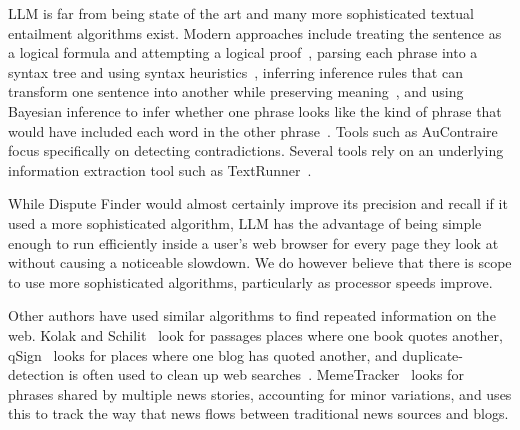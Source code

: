 \documentclass{www2010-submission}
\newcommand{\todo}[1]{}
\begin{document}
LLM is far from being state of the art and many more sophisticated textual entailment algorithms exist. Modern approaches include treating the sentence as a logical formula and attempting a logical proof~\cite{Bayer2001,Bos2005}, parsing each phrase into a syntax tree and using syntax heuristics~\cite{Snow2006}, inferring inference rules that can transform one sentence into another while preserving meaning~\cite{Lin2001,Dinu2009,Bhagat2009}, and using Bayesian inference to infer whether one phrase looks like the kind of phrase that would have included each word in the other phrase~\cite{Glickman2005}. Tools such as AuContraire~\cite{Ritter} focus specifically on detecting contradictions. Several tools rely on an underlying information extraction tool such as TextRunner~\cite{Etzioni2008}.

While Dispute Finder would almost certainly improve its precision and recall if it used a more sophisticated algorithm, LLM has the advantage of being simple enough to run efficiently inside a user's web browser for every page they look at without causing a noticeable slowdown. We do however believe that there is scope to use more sophisticated algorithms, particularly as processor speeds improve.


\todo{Mention that we could add the +ve and -ve n-grams to the client code? Actually do this?}

\todo{Discuss how and why this is simpler than the server-side classification method}
\todo{Explain how we avoid downloading the entire database}

\todo{Should we have a version where the interface merely suggests n-grams that should be used by the classifier}
\todo{Can we present all these systems without giving detailed stats about how they compare?}
\todo{Add support for a user to enter 'anti-phrases' when a snippet is wrongly highlighted}
\todo{Add support for a user to enter a paraphrase that will match the snippet they are looking at}
\todo{Do a load more people in a final user-study round. Try to get it up to 8.}
\todo{Explain how our algorithm relates to existing NLP work - due to unusual domain}


Other authors have used similar algorithms to find repeated information on the web. Kolak and Schilit~\cite{Kolak2008} look for passages places where one book quotes another, qSign~\cite{Kim2009} looks for places where one blog has quoted another, and duplicate-detection is often used to clean up web searches~\cite{Theobald2008}. MemeTracker~\cite{Backstrom2009} looks for phrases shared by multiple news stories, accounting for minor variations, and uses this to track the way that news flows between traditional news sources and blogs.
\end{document}

